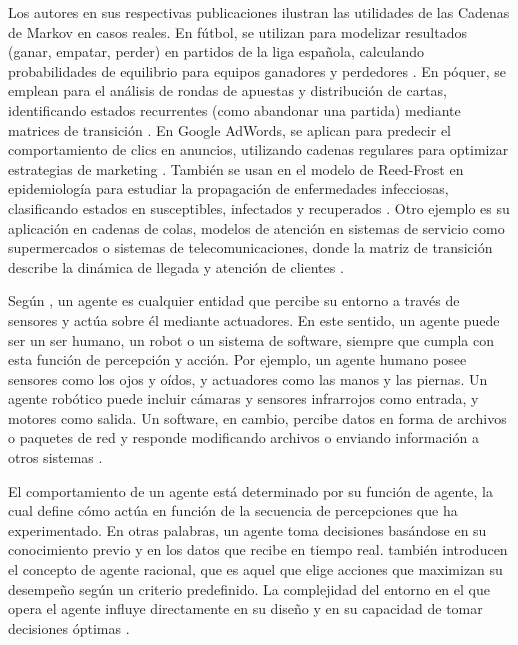 Los autores en sus respectivas publicaciones ilustran las utilidades de las Cadenas de Markov en casos reales. En fútbol, se utilizan para modelizar resultados (ganar, empatar, perder) en partidos de la liga española, calculando probabilidades de equilibrio para equipos ganadores y perdedores \cite[p. 33-41]{matas_introduccion_2024}. En póquer, se emplean para el análisis de rondas de apuestas y distribución de cartas, identificando estados recurrentes (como abandonar una partida) mediante matrices de transición \cite[p. 42-48]{matas_introduccion_2024}. En Google AdWords, se aplican para predecir el comportamiento de clics en anuncios, utilizando cadenas regulares para optimizar estrategias de marketing \cite[p. 49-53]{matas_introduccion_2024}. También se usan en el modelo de Reed-Frost en epidemiología para estudiar la propagación de enfermedades infecciosas, clasificando estados en susceptibles, infectados y recuperados \cite[p. 91-107]{bobadilla_cadenas_2010}. Otro ejemplo es su aplicación en cadenas de colas, modelos de atención en sistemas de servicio como supermercados o sistemas de telecomunicaciones, donde la matriz de transición describe la dinámica de llegada y atención de clientes  \cite[p. 57-61]{bobadilla_cadenas_2010}.


Según \citeauthor{russell_artificial_2022} \citeyear{russell_artificial_2022}, un agente es cualquier entidad que percibe su entorno a través de sensores y actúa sobre él mediante actuadores. En este sentido, un agente puede ser un ser humano, un robot o un sistema de software, siempre que cumpla con esta función de percepción y acción. Por ejemplo, un agente humano posee sensores como los ojos y oídos, y actuadores como las manos y las piernas. Un agente robótico puede incluir cámaras y sensores infrarrojos como entrada, y motores como salida. Un software, en cambio, percibe datos en forma de archivos o paquetes de red y responde modificando archivos o enviando información a otros sistemas \cite{russell_artificial_2022}.

El comportamiento de un agente está determinado por su función de agente, la cual define cómo actúa en función de la secuencia de percepciones que ha experimentado. En otras palabras, un agente toma decisiones basándose en su conocimiento previo y en los datos que recibe en tiempo real. \citeauthor{russell_artificial_2022} \citeyear{russell_artificial_2022} también introducen el concepto de agente racional, que es aquel que elige acciones que maximizan su desempeño según un criterio predefinido. La complejidad del entorno en el que opera el agente influye directamente en su diseño y en su capacidad de tomar decisiones óptimas \cite{russell_artificial_2022}.


